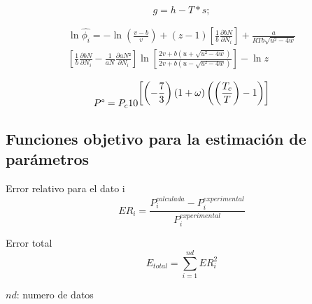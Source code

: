 \begin{equation}\label{eq:gibbs}
g = h - T * s;
\end{equation}


\begin{multline}\label{eq:fugacity}
\ln\hat{\phi_i} = - \ln\left(\frac{v-b}{v}\right) 
+ (z-1)\left[\frac{1}{b}\frac{\partial bN}{\partial N_i}\right]
+ \frac{a}{RTb\sqrt{u^2-4w}}
\\
\left[\frac{1}{b}\frac{\partial bN}{\partial N_i}
- \frac{1}{aN}\frac{\partial aN²}{\partial N_i}\right]
\ln\left[\frac{2v+b\left(u + \sqrt{u²-4w}\right)}{2v+b\left(u - \sqrt{u²-4w}\right)}\right]
-\ln{z}
\end{multline}




\begin{equation}\label{eq:pressureacentricfactor}
 P\degree= P_c 10^{\displaystyle\left[\left(-\frac{7}{3}\right) \left(1+\omega \right)  \left(\left(\frac{T_c}{T}\right) - 1 \right) \right]}
\end{equation}


\subsection{Funciones objetivo para la estimación de parámetros}
Error relativo para el dato i
\begin{equation}\label{eq:relativeerror}
ER_i=\frac{P_i^{calculada} - P_i^{experimental}}{P_i^{experimental}}
\end{equation}

Error total
\begin{equation}\label{eq:totalerror}
	E_{total} = \sum_{i=1}^{nd} ER_i^2
\end{equation}

$nd$: numero de datos
